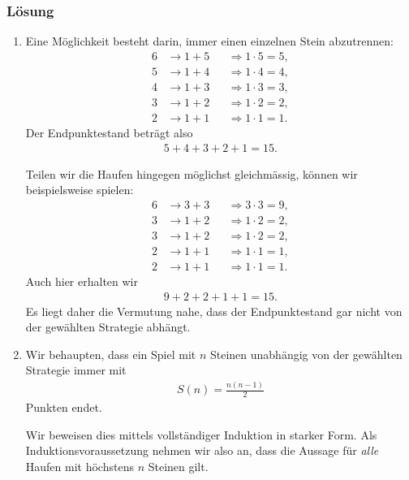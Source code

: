 \documentclass[a4paper,10pt]{article}
\newcommand{\s}[1]{#1}
\begin{document}
\s{\subsubsection*{Lösung}

\begin{enumerate}[label=(\alph*)]
    \item Eine Möglichkeit besteht darin, immer einen einzelnen Stein abzutrennen:
    \begin{align*}
        6&\longrightarrow 1+5 &&\Rightarrow 1\cdot5=5,\\
        5&\longrightarrow 1+4 &&\Rightarrow 1\cdot4=4,\\
        4&\longrightarrow 1+3 &&\Rightarrow 1\cdot3=3,\\
        3&\longrightarrow 1+2 &&\Rightarrow 1\cdot2=2,\\
        2&\longrightarrow 1+1 &&\Rightarrow 1\cdot1=1.
    \end{align*}
    Der Endpunktestand beträgt also
    \begin{align*}
        5+4+3+2+1=15.
    \end{align*}

    Teilen wir die Haufen hingegen möglichst gleichmässig, können wir beispielsweise spielen:
    \begin{align*}
        6&\longrightarrow 3+3 &&\Rightarrow 3\cdot3=9,\\
        3&\longrightarrow 1+2 &&\Rightarrow 1\cdot2=2,\\
        3&\longrightarrow 1+2 &&\Rightarrow 1\cdot2=2,\\
        2&\longrightarrow 1+1 &&\Rightarrow 1\cdot1=1,\\
        2&\longrightarrow 1+1 &&\Rightarrow 1\cdot1=1.
    \end{align*}
    Auch hier erhalten wir
    \begin{align*}
        9+2+2+1+1=15.
    \end{align*}
    Es liegt daher die Vermutung nahe, dass der Endpunktestand gar nicht von der gewählten Strategie abhängt.

    \item
    Wir behaupten, dass ein Spiel mit $n$ Steinen unabhängig von der gewählten Strategie immer mit
    \begin{align*}
        S(n)=\frac{n(n-1)}{2}
    \end{align*}
    Punkten endet.

    Wir beweisen dies mittels vollständiger Induktion in starker Form. Als Induktionsvoraussetzung nehmen wir also an, dass die Aussage für \emph{alle} Haufen mit höchstens $n$ Steinen gilt.


\end{enumerate}}
\end{document}
